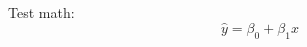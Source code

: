 \documentclass[12pt,a4paper]{article}
\begin{document}
Test math:
\[
\hat{y} = \beta_0 + \beta_1 x
\]
\end{document}
